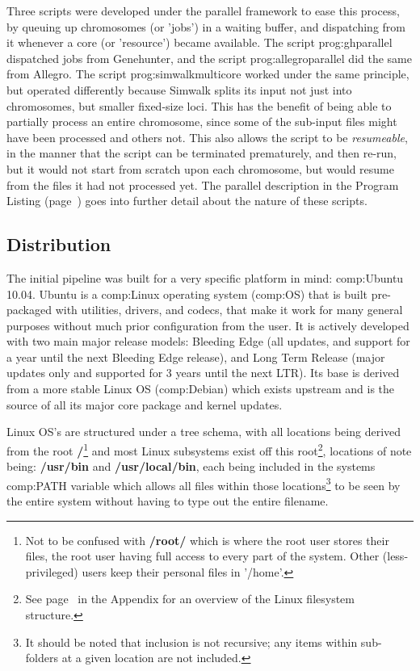 Three scripts were developed under the parallel framework to ease this process, by queuing up chromosomes (or 'jobs') in a waiting buffer, and dispatching from it whenever a core (or 'resource') became available. The script \gls{prog:ghparallel} dispatched jobs from Genehunter, and the script \gls{prog:allegroparallel} did the same from Allegro. The script \gls{prog:simwalkmulticore}\label{ref:meth:simwalkmulti} worked under the same principle, but operated differently because Simwalk splits its input not just into chromosomes, but smaller fixed-size loci. This has the benefit of being able to partially process an entire chromosome, since some of the sub-input files might have been processed and others not. This also allows the script to be \textit{resumeable}, in the manner that the script can be terminated prematurely, and then re-run, but it would not start from scratch upon each chromosome, but would resume from the files it had not processed yet. The parallel description in the Program Listing (page~\pageref{ref:meth:proglist}) goes into further detail about the nature of these scripts.

\subsection{Distribution}

The initial pipeline was built for a very specific platform in mind: \gls{comp:Ubuntu} 10.04. Ubuntu is a \gls{comp:Linux} operating system (\gls{comp:OS}) that is built pre-packaged with utilities, drivers, and codecs, that make it work for many general purposes without much prior configuration from the user. It is actively developed with two main major release models: Bleeding Edge (all updates, and support for a year until the next Bleeding Edge release), and Long Term Release (major updates only and supported for 3 years until the next LTR). Its base is derived from a more stable Linux OS (\gls{comp:Debian}) which exists upstream and is the source of all its major core package and kernel updates.

Linux OS's are structured under a tree schema, with all locations being derived from the root \textbf{/}\footnote{Not to be confused with \textbf{/root/} which is where the root user stores their files, the root user having full access to every part of the system. Other (less-privileged) users keep their personal files in '/home'.} and most Linux subsystems exist off this root\footnote{See page~\pageref{ref:app:semaphores} in the Appendix for an overview of the Linux filesystem structure.}, locations of note being: \textbf{/usr/bin} and \textbf{/usr/local/bin}, each being included in the systems \gls{comp:PATH} variable which allows all files within those locations\footnote{It should be noted that inclusion is not recursive; any items within sub-folders at a given location are not included.} to be seen by the entire system without having to type out the entire filename.

